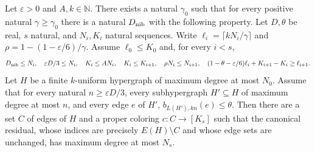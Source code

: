 \begin{lemma}
Let $\varepsilon>0$ and $A,k\in\mathbb N$. There exists a natural
$\gamma_0$ such that for every positive natural $\gamma\ge\gamma_0$
there is a natural $D_{\rm nib}$ with the following property.
Let $D,\theta$ be real, $s$ natural, and $N_i,K_i$ natural sequences.
Write $\ell_i=\lceil kN_i/\gamma\rceil$ and
$\rho=1-(1-\varepsilon/6)/\gamma$. Assume $\ell_0\le K_0$ and,
for every $i<s$,
\[
D_{\rm nib}\le N_i,\quad \varepsilon D/3\le N_i,\quad
K_i\le AN_i,\quad K_i\le K_{i+1},\quad \rho N_i\le N_{i+1},\quad
(1-\theta-\varepsilon/6)\ell_i+K_{i+1}-K_i\ge\ell_{i+1}.
\]
Let $H$ be a finite $k$-uniform hypergraph of maximum degree at most $N_0$.
Assume that for every natural $n\ge\varepsilon D/3$, every subhypergraph
$H'\subseteq H$ of maximum degree at most $n$, and every edge $e$ of $H'$,
$b_{L(H'),kn}(e)\le\theta$. Then there are a set $C$ of edges of $H$
and a proper coloring $c:C\to[K_s]$ such that the canonical residual,
whose indices are precisely $E(H)\setminus C$ and whose edge sets are
unchanged, has maximum degree at most $N_s$.
\end{lemma}
